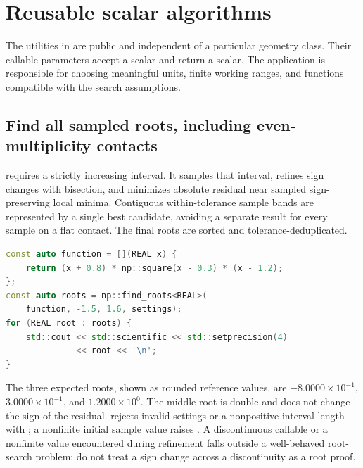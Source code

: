 \section{Reusable scalar algorithms}

The utilities in  are public and independent of a particular
geometry class. Their callable parameters accept a scalar and return a scalar.
The application is responsible for choosing meaningful units, finite working
ranges, and functions compatible with the search assumptions.

\subsection{Find all sampled roots, including even-multiplicity contacts}

 requires a strictly
increasing interval. It samples that interval, refines sign changes with
bisection, and minimizes absolute residual near sampled sign-preserving local
minima. Contiguous within-tolerance sample bands are represented by a single
best candidate, avoiding a separate result for every sample on a flat contact.
The final roots are sorted and tolerance-deduplicated.
\par\noindent\begin{minipage}{\linewidth}
\begin{lstlisting}[language=C++]
const auto function = [](REAL x) {
    return (x + 0.8) * np::square(x - 0.3) * (x - 1.2);
};
const auto roots = np::find_roots<REAL>(
    function, -1.5, 1.6, settings);
for (REAL root : roots) {
    std::cout << std::scientific << std::setprecision(4)
              << root << '\n';
}
\end{lstlisting}
\end{minipage}\par
The three expected roots, shown as rounded reference values, are
$-8.0000\times10^{-1}$, $3.0000\times10^{-1}$, and
$1.2000\times10^{0}$. The middle root is double and does not change the sign
of the residual.  rejects invalid settings or a nonpositive
interval length with ; a nonfinite initial sample
value raises . A discontinuous callable or a nonfinite
value encountered during refinement falls outside a well-behaved root-search
problem; do not treat a sign change across a discontinuity as a root proof.

